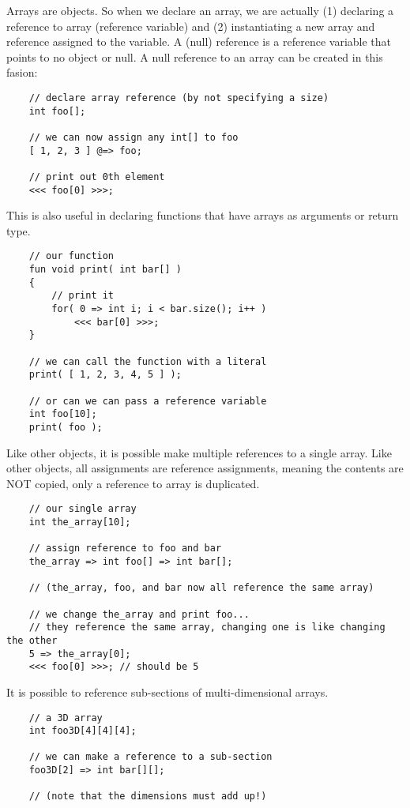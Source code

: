 Arrays are objects. So when we declare an array, we are actually (1) declaring a reference to array (reference variable) and (2) instantiating a new array and reference assigned to the variable. A (null) reference is a reference variable that points to no
 object or null. A null reference to an array can be created in this fasion:
\begin{verbatim}
    // declare array reference (by not specifying a size)
    int foo[];

    // we can now assign any int[] to foo
    [ 1, 2, 3 ] @=> foo;

    // print out 0th element
    <<< foo[0] >>>;
\end{verbatim}

This is also useful in declaring functions that have arrays as arguments or return type.
\begin{verbatim}
    // our function
    fun void print( int bar[] )
    {
        // print it
        for( 0 => int i; i < bar.size(); i++ )
            <<< bar[0] >>>;
    }

    // we can call the function with a literal
    print( [ 1, 2, 3, 4, 5 ] );

    // or can we can pass a reference variable
    int foo[10];
    print( foo );
\end{verbatim}

Like other objects, it is possible make multiple references to a single array. Like other objects, all assignments are reference assignments, meaning the contents are NOT copied, only a reference to array is duplicated.
\begin{verbatim}
    // our single array
    int the_array[10];

    // assign reference to foo and bar
    the_array => int foo[] => int bar[];

    // (the_array, foo, and bar now all reference the same array)

    // we change the_array and print foo...
    // they reference the same array, changing one is like changing the other
    5 => the_array[0];
    <<< foo[0] >>>; // should be 5
\end{verbatim}

It is possible to reference sub-sections of multi-dimensional arrays.
\begin{verbatim}
    // a 3D array
    int foo3D[4][4][4];

    // we can make a reference to a sub-section
    foo3D[2] => int bar[][];

    // (note that the dimensions must add up!)
\end{verbatim}
